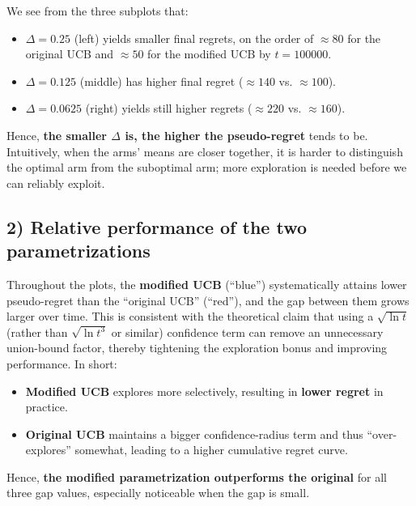 We see from the three subplots that:
\begin{itemize}
    \item \( \Delta=0.25 \) (left) yields smaller final regrets, on the order of \( \approx 80 \) for the original UCB and \( \approx 50 \) for the modified UCB by \( t=100000 \).
    \item \( \Delta=0.125 \) (middle) has higher final regret (\( \approx 140 \) vs. \( \approx 100 \)).
    \item \( \Delta=0.0625 \) (right) yields still higher regrets (\( \approx 220 \) vs. \( \approx 160 \)).
\end{itemize}

Hence, \textbf{the smaller \( \Delta \) is, the higher the pseudo-regret} tends to be. Intuitively, when the arms’ means are closer together, it is harder to distinguish the optimal arm from the suboptimal arm; more exploration is needed before we can reliably exploit.

\subsection{2) Relative performance of the two parametrizations}

Throughout the plots, the \textbf{modified UCB} (“blue”) systematically attains lower pseudo-regret than the “original UCB” (“red”), and the gap between them grows larger over time. This is consistent with the theoretical claim that using a \( \sqrt{\ln t} \) (rather than \( \sqrt{\ln t^3} \) or similar) confidence term can remove an unnecessary union-bound factor, thereby tightening the exploration bonus and improving performance. In short:

\begin{itemize}
    \item \textbf{Modified UCB} explores more selectively, resulting in \textbf{lower regret} in practice.
    \item \textbf{Original UCB} maintains a bigger confidence-radius term and thus “over-explores” somewhat, leading to a higher cumulative regret curve.
\end{itemize}

Hence, \textbf{the modified parametrization outperforms the original} for all three gap values, especially noticeable when the gap is small.